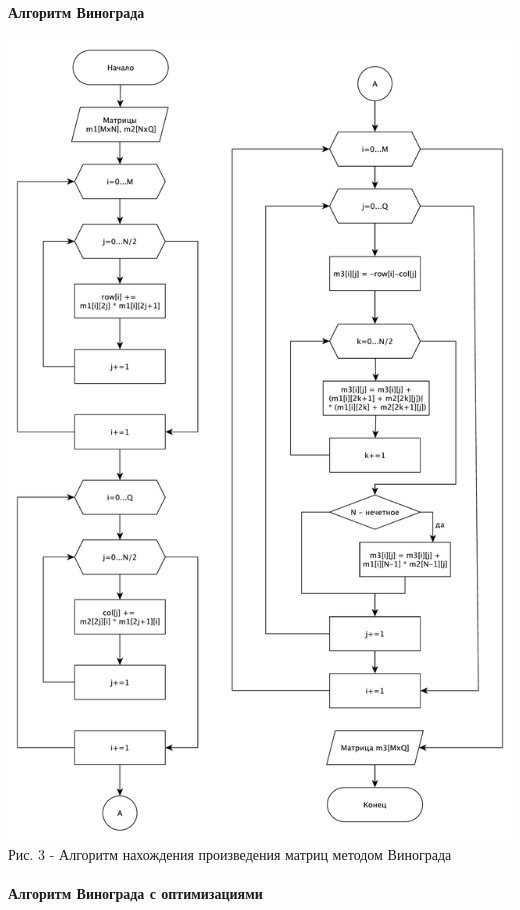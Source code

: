 \documentclass[a4paper,14pt]{article} %
\begin{document}
	\hfill
        \paragraph{Алгоритм Винограда}
        
        \begin{center}
        		\includegraphics[scale = 0.53]{shema2} \\ Рис. 3 - Алгоритм нахождения произведения матриц методом Винограда
	\end{center}
	
	\hfill
	\paragraph{Алгоритм Винограда с оптимизациями}
	
\end{document}
